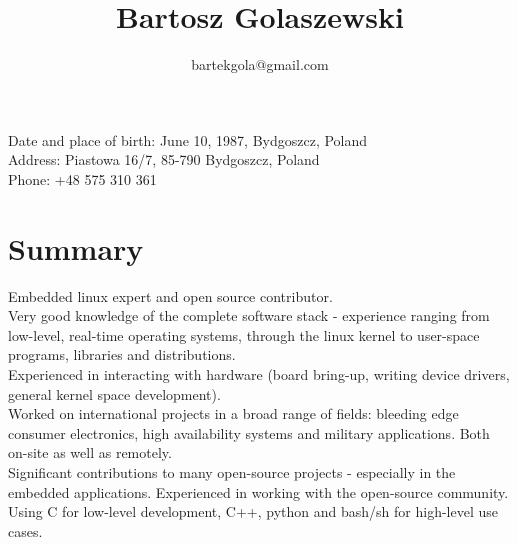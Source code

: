 \documentclass[10pt]{article}
\title{\bfseries\Huge Bartosz Golaszewski}
\author{bartekgola@gmail.com}
\date{}
\begin{document}
	\begin{minipage}{0.65\textwidth}
		\begingroup
		\let\center\flushleft
		\let\endcenter\endflushleft
		\maketitle
		\endgroup
	\end{minipage}
	\begin{minipage}{0.3\textwidth}
	\end{minipage}
	\vspace{2em}
	\linebreak
	\begin{minipage}[ht]{0.68\textwidth}
		Date and place of birth: June 10, 1987, Bydgoszcz, Poland\\
		Address: Piastowa 16/7, 85-790 Bydgoszcz, Poland\\
		Phone: +48 575 310 361
	\end{minipage}

	\vspace{20pt}

\section*{Summary}
Embedded linux expert and open source contributor.\\

Very good knowledge of the complete software stack - experience ranging from low-level, real-time
operating systems, through the linux kernel to user-space programs, libraries and distributions.\\

Experienced in interacting with hardware (board bring-up, writing device drivers, general kernel
space development).\\

Worked on international projects in a broad range of fields: bleeding edge consumer electronics,
high availability systems and military applications. Both on-site as well as remotely.\\

Significant contributions to many open-source projects - especially in the embedded applications.
Experienced in working with the open-source community.\\

Using C for low-level development, C++, python and bash/sh for high-level use cases.\\
\end{document}
